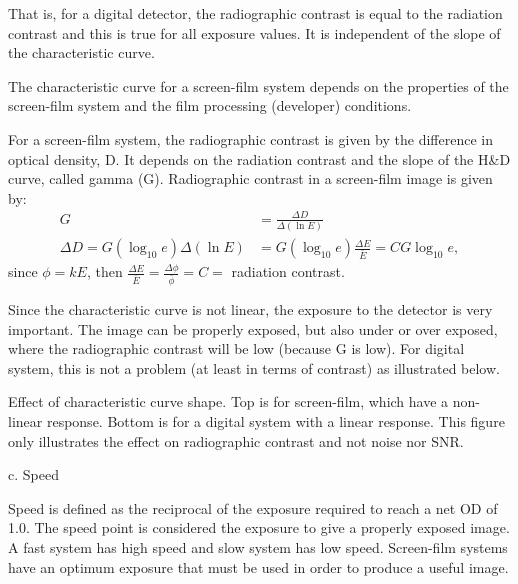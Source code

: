 \documentclass[mphy386-notes.tex]{subfiles}
\begin{document}
That is, for a digital detector, the radiographic contrast is equal to the
radiation contrast and this is true for all exposure values. It is independent
of the slope of the characteristic curve.



The characteristic curve for a screen-film system depends on the properties of the
screen-film system and the film processing (developer) conditions.

For a screen-film system, the radiographic contrast is given by the difference in
optical density, D. It depends on the radiation contrast and the slope of the
H\&D curve, called gamma (G). Radiographic contrast in a screen-film image is
given by:
\begin{align}
  G &= \frac{\Delta D}{\Delta(\ln E)}\\
  \Delta D = G(\log_{10}e)\Delta(\ln E) &= G(\log_{10}e)\frac{\Delta E}{\bar{E}} = CG\log_{10}e, 
\end{align}
since $\phi = kE$, then $\frac{\Delta E}{\bar{E}} = \frac{\Delta \phi}{\bar{\phi}} = C =$ radiation contrast.

Since the characteristic curve is not linear, the exposure to the detector is
very important. The image can be properly exposed, but also under or over
exposed, where the radiographic contrast will be low (because G is low).  For
digital system, this is not a problem (at least in terms of contrast) as
illustrated below.

Effect of characteristic curve shape.  Top is for screen-film, which have a
non-linear response. Bottom is for a digital system with a linear response.
This figure only illustrates the effect on radiographic contrast and not noise
nor SNR.

c. Speed 

Speed is defined as the reciprocal of the exposure required to reach a net OD of
1.0. The speed point is considered the exposure to give a properly exposed
image. A fast system has high speed and slow system has low speed.  Screen-film
systems have an optimum exposure that must be used in order to produce a useful
image.
\end{document}
